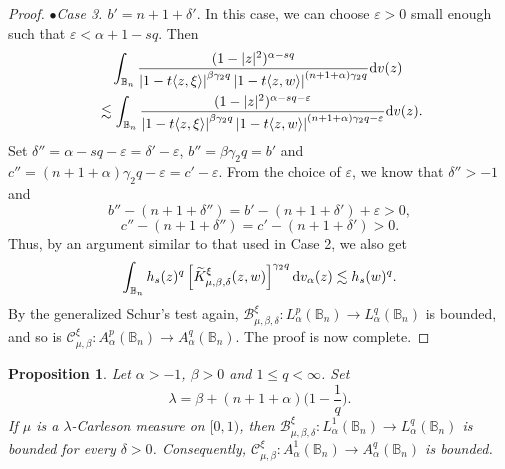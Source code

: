 \documentclass[preprint,12pt,times]{elsarticle}
\newtheorem{proposition}[theorem]{Proposition}
\theoremstyle{definition}
\theoremstyle{remark}
\numberwithin{equation}{section}
\begin{document}
\begin{proof}
$\bullet${\it Case 3. $b'=n+1+\delta'$}. In this case, we can choose $\varepsilon>0$ small enough such that $\varepsilon<\alpha+1-sq$. Then 
\begin{align*}
&\quad \int_{\mathbb{B}_n}\frac{(1-|z|^2)^{\alpha-sq}}{\left|1-t\langle z,\xi\rangle\right|^{\beta\gamma_2 q}\left|1-t\langle z,w\rangle\right|^{(n+1+\alpha)\gamma_2 q}}{\rm d}v(z)\\
&\lesssim \int_{\mathbb{B}_n}\frac{(1-|z|^2)^{\alpha-sq-\varepsilon}}{\left|1-t\langle z,\xi\rangle\right|^{\beta\gamma_2 q}\left|1-t\langle z,w\rangle\right|^{(n+1+\alpha)\gamma_2 q-\varepsilon}}{\rm d}v(z).
\end{align*}
Set $\delta''=\alpha-sq-\varepsilon=\delta'-\varepsilon$, $b''=\beta\gamma_2 q=b'$ and $c''=(n+1+\alpha)\gamma_2 q-\varepsilon=c'-\varepsilon$. From the choice of $\varepsilon$, we know that $\delta''>-1$ and 
\[
    b''-(n+1+\delta'')=b'-(n+1+\delta')+\varepsilon>0,
\]
\[
    c''-(n+1+\delta'')=c'-(n+1+\delta')>0.
\]
Thus, by an argument similar to that used in Case 2, we also get
\[
    \int_{\mathbb{B}_n}h_s(z)^q\left[\widetilde{K}_{\mu,\beta,\delta}^{\xi}(z,w)\right]^{\gamma_2 q}{\rm d}v_{\alpha}(z)\lesssim h_s(w)^q.
\]
By the generalized Schur's test again, $\mathcal{B}_{\mu,\beta,\delta}^{\xi}: L_{\alpha}^p(\mathbb{B}_n)\to L_{\alpha}^q(\mathbb{B}_n)$ is bounded, and so is $\mathcal{C}_{\mu,\beta}^{\xi}: A_{\alpha}^p(\mathbb{B}_n)\to A_{\alpha}^q(\mathbb{B}_n)$. The proof is now complete.
\end{proof}

\begin{proposition}\label{proposition3.2}
Let $\alpha>-1$, $\beta>0$ and $1\leq q<\infty$. Set 
\[
    \lambda=\beta+(n+1+\alpha)\Big(1-\frac{1}{q}\Big).
\]
If $\mu$ is a $\lambda$-Carleson measure on $[0,1)$, then $\mathcal{B}_{\mu,\beta,\delta}^{\xi}: L_{\alpha}^1(\mathbb{B}_n)\to L_{\alpha}^q(\mathbb{B}_n)$ is bounded for every $\delta>0$. Consequently, $\mathcal{C}_{\mu,\beta}^{\xi}: A_{\alpha}^1(\mathbb{B}_n)\to A_{\alpha}^q(\mathbb{B}_n)$ is bounded. 
\end{proposition}
\end{document}
